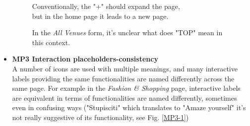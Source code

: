 \begin{itemize}
\begin{figure}[!ht]
\begin{minipage}{\linewidth}
                \captionsetup{justification=centering}
                \caption{Conventionally, the "+" should expand the page,\\
                but in the home page it leads to a new page.}
                \label{MP2-1}
            \end{minipage}
        \end{figure}
        \begin{figure}[!ht]
            \begin{minipage}{\linewidth}
                \centering
                \captionsetup{justification=centering}
                \caption{In the \emph{All Venues} form, it's unclear what does "TOP" mean in this context.}
                \label{MP2-2}
            \end{minipage}
        \end{figure}
    \item \textbf{MP3 Interaction placeholders-consistency}\\
        A number of icons are used with multiple meanings, and many interactive labels providing the same functionalities are named differently across the same page. For example in the \emph{Fashion \& Shopping} page, interactive labels are equivalent in terms of functionalities are named differently, sometimes even in confusing ways ("Stupisciti" which translates to "Amaze yourself" it's not really suggestive of its functionality, see Fig. \ref{MP3-1})
        \begin{figure}[!ht]
            \begin{minipage}{\linewidth}
                \centering

\end{minipage}
\end{figure}
\end{itemize}
